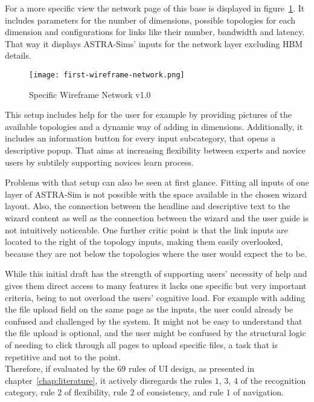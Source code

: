 For a more specific view the network page of this base is displayed in figure~\ref{fig:wire-2}. It includes parameters for the number of dimensions, possible topologies for each dimension and configurations for links like their number, bandwidth and latency. That way it displays \acp{ASTRA-Sim}' inputs for the network layer excluding \ac{HBM} details.

\begin{figure}[h]
    \centering
    \texttt{[image: first-wireframe-network.png]}
    \caption{Specific Wireframe Network v1.0}
    \label{fig:wire-2}
\end{figure}

This setup includes help for the user for example by providing pictures of the available topologies and a dynamic way of adding in dimensions. Additionally, it includes an information button for every input subcategory, that opens a descriptive popup. That aims at increasing flexibility between experts and novice users by subtilely supporting novices learn process. 

Problems with that setup can also be seen at first glance. Fitting all inputs of one layer of \ac{ASTRA-Sim} is not possible with the space available in the chosen wizard layout.
Also, the connection between the headline and descriptive text to the wizard content as well as the connection between the wizard and the user guide is not intuitively noticeable. One further critic point is that the link inputs are located to the right of the topology inputs, making them easily overlooked, because they are not below the topologies where the user would expect the to be.

While this initial draft has the strength of supporting users' necessity of help and gives them direct access to many features it lacks one specific but very important criteria, being to not overload the users' cognitive load.
For example with adding the file upload field on the same page as the inputs, the user could already be confused and challenged by the system. It might not be easy to understand that the file upload is optional, and the user might be confused by the structural logic of needing to click through all pages to upload specific files, a task that is repetitive and not to the point. \\
Therefore, if evaluated by the $69$ rules of \ac{UI} design, as presented in chapter~\ref{chap:literature}, it actively disregards the rules $1$, $3$, $4$ of the recognition category, rule $2$ of flexibility, rule $2$ of consistency, and rule $1$ of navigation.

